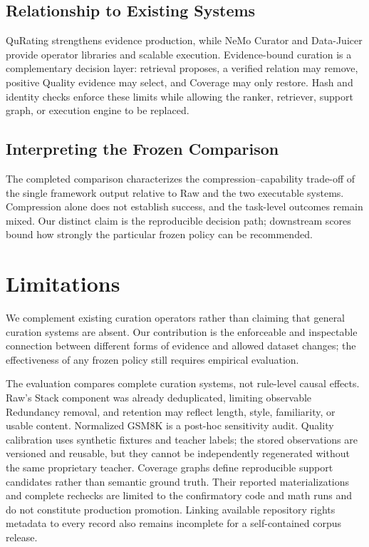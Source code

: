 \documentclass[conference]{IEEEtran}
\begin{document}
\subsection{Relationship to Existing Systems}
QuRating strengthens evidence production, while NeMo Curator and Data-Juicer
provide operator libraries and scalable execution. Evidence-bound curation is
a complementary decision layer: retrieval proposes, a verified relation may
remove, positive Quality evidence may select, and Coverage may only restore.
Hash and identity checks enforce these limits while allowing the ranker, retriever,
support graph, or execution engine to be replaced.

\subsection{Interpreting the Frozen Comparison}
The completed comparison characterizes the compression--capability trade-off of
the single framework output relative to Raw and the two executable systems.
Compression alone does not establish success, and the task-level outcomes remain
mixed. Our distinct claim is the reproducible decision path;
downstream scores bound how strongly the particular frozen policy can be
recommended.

\section{Limitations}
We complement existing curation operators rather than claiming that general
curation systems are absent. Our contribution is the enforceable and
inspectable connection between different forms of evidence and allowed dataset
changes; the effectiveness of any frozen policy still requires empirical
evaluation.

The evaluation compares complete curation systems, not rule-level causal
effects. Raw's Stack component was already deduplicated, limiting observable
Redundancy removal, and retention may reflect length, style, familiarity, or
usable content. Normalized GSM8K is a post-hoc sensitivity audit. Quality
calibration uses synthetic fixtures and
teacher labels; the stored observations are versioned and reusable, but they
cannot be independently regenerated without the same proprietary teacher.
Coverage graphs define reproducible support candidates rather than semantic
ground truth. Their reported materializations and complete rechecks are limited
to the confirmatory code and math runs and do not constitute production
promotion. Linking available repository rights metadata to every record also
remains incomplete for a self-contained corpus release.
\end{document}

